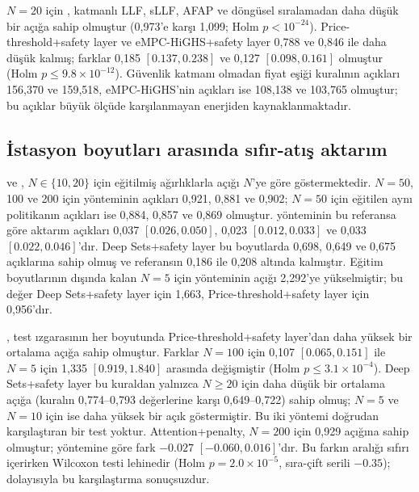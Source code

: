 $N=20$ için \method{}, katmanlı LLF, sLLF, AFAP ve döngüsel sıralamadan daha düşük bir açığa sahip olmuştur (0,973'e karşı 1,099; Holm $p<10^{-24}$).
Price-threshold+safety layer ve eMPC-HiGHS+safety layer 0,788 ve 0,846 ile daha düşük kalmış; farklar 0,185 $[0.137,0.238]$ ve 0,127 $[0.098,0.161]$ olmuştur (Holm $p\le9.8\times10^{-12}$).
Güvenlik katmanı olmadan fiyat eşiği kuralının açıkları 156,370 ve 159,518, eMPC-HiGHS'nin açıkları ise 108,138 ve 103,765 olmuştur; bu açıklar büyük ölçüde karşılanmayan enerjiden kaynaklanmaktadır.


\subsection{İstasyon boyutları arasında sıfır-atış aktarım}\label{sec:res-scaling}

 ve , $N\in\{10,20\}$ için eğitilmiş ağırlıklarla açığı $N$'ye göre göstermektedir.
$N=50$, 100 ve 200 için \method{} yönteminin açıkları 0,921, 0,881 ve 0,902; $N=50$ için eğitilen aynı politikanın açıkları ise 0,884, 0,857 ve 0,869 olmuştur.
\method{} yönteminin bu referansa göre aktarım açıkları 0,037 $[0.026,0.050]$, 0,023 $[0.012,0.033]$ ve 0,033 $[0.022,0.046]$'dır.
Deep Sets+safety layer bu boyutlarda 0,698, 0,649 ve 0,675 açıklarına sahip olmuş ve referansın 0,186 ile 0,208 altında kalmıştır.
Eğitim boyutlarının dışında kalan $N=5$ için \method{} yönteminin açığı 2,292'ye yükselmiştir; bu değer Deep Sets+safety layer için 1,663, Price-threshold+safety layer için 0,956'dır.

\method{}, test ızgarasının her boyutunda Price-threshold+safety layer'dan daha yüksek bir ortalama açığa sahip olmuştur.
Farklar $N=100$ için 0,107 $[0.065,0.151]$ ile $N=5$ için 1,335 $[0.919,1.840]$ arasında değişmiştir (Holm $p\le3.1\times10^{-4}$).
Deep Sets+safety layer bu kuraldan yalnızca $N\ge20$ için daha düşük bir ortalama açığa (kuralın 0,774--0,793 değerlerine karşı 0,649--0,722) sahip olmuş; $N=5$ ve $N=10$ için ise daha yüksek bir açık göstermiştir.
Bu iki yöntemi doğrudan karşılaştıran bir test yoktur.
Attention+penalty, $N=200$ için 0,929 açığına sahip olmuştur; \method{} yöntemine göre fark $-0.027$ $[-0.060,0.016]$'dır.
Bu farkın aralığı sıfırı içerirken Wilcoxon testi \method{} lehinedir (Holm $p=2.0\times10^{-5}$, sıra-çift serili $-0.35$); dolayısıyla bu karşılaştırma sonuçsuzdur.

